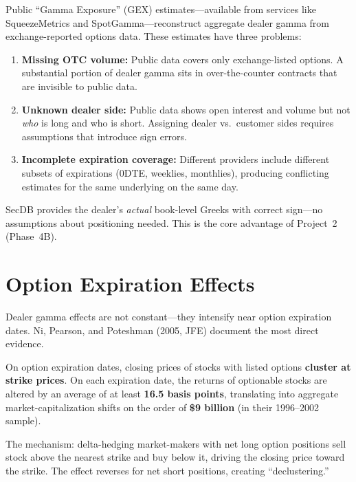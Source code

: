 \begin{keyidea}
Public ``Gamma Exposure'' (GEX) estimates---available from services
like SqueezeMetrics and SpotGamma---reconstruct aggregate dealer gamma
from exchange-reported options data.  These estimates have three
problems:

\begin{enumerate}[nosep]
  \item \textbf{Missing OTC volume:} Public data covers only
        exchange-listed options.  A substantial portion of dealer
        gamma sits in over-the-counter contracts that are invisible
        to public data.
  \item \textbf{Unknown dealer side:} Public data shows open interest
        and volume but not \emph{who} is long and who is short.
        Assigning dealer vs.\ customer sides requires assumptions
        that introduce sign errors.
  \item \textbf{Incomplete expiration coverage:} Different providers
        include different subsets of expirations (0DTE, weeklies,
        monthlies), producing conflicting estimates for the same
        underlying on the same day.
\end{enumerate}

SecDB provides the dealer's \emph{actual} book-level Greeks with
correct sign---no assumptions about positioning needed.  This is
the core advantage of Project~2 (Phase~4B).
\end{keyidea}


\section{Option Expiration Effects}
\label{sec:expiration-effects}

Dealer gamma effects are not constant---they intensify near option
expiration dates.  Ni, Pearson, and Poteshman (2005, JFE) document
the most direct evidence.

\begin{keyresult}
On option expiration dates, closing prices of stocks with listed
options \textbf{cluster at strike prices}.  On each expiration date,
the returns of optionable stocks are altered by an average of at
least \textbf{16.5 basis points}, translating into aggregate
market-capitalization shifts on the order of \textbf{\$9 billion}
(in their 1996--2002 sample).

The mechanism: delta-hedging market-makers with net long option
positions sell stock above the nearest strike and buy below it,
driving the closing price toward the strike.  The effect reverses
for net short positions, creating ``declustering.''
\end{keyresult}

